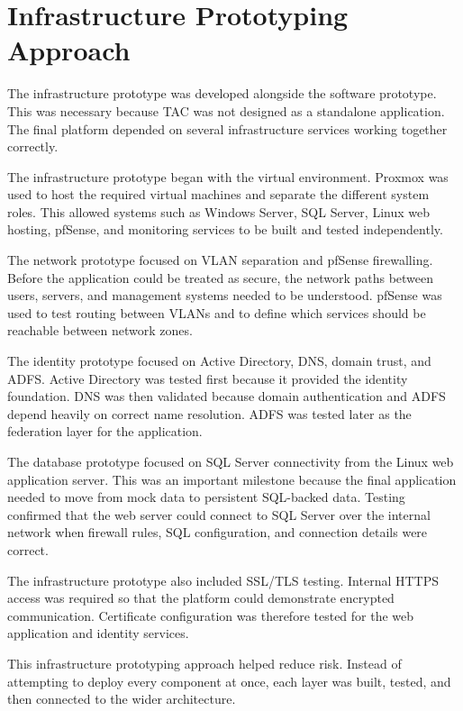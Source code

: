 \section{Infrastructure Prototyping Approach}

The infrastructure prototype was developed alongside the software prototype. This was necessary because TAC was not designed as a standalone application. The final platform depended on several infrastructure services working together correctly.

The infrastructure prototype began with the virtual environment. Proxmox was used to host the required virtual machines and separate the different system roles. This allowed systems such as Windows Server, SQL Server, Linux web hosting, pfSense, and monitoring services to be built and tested independently.

The network prototype focused on VLAN separation and pfSense firewalling. Before the application could be treated as secure, the network paths between users, servers, and management systems needed to be understood. pfSense was used to test routing between VLANs and to define which services should be reachable between network zones.

The identity prototype focused on Active Directory, DNS, domain trust, and ADFS. Active Directory was tested first because it provided the identity foundation. DNS was then validated because domain authentication and ADFS depend heavily on correct name resolution. ADFS was tested later as the federation layer for the application.

The database prototype focused on SQL Server connectivity from the Linux web application server. This was an important milestone because the final application needed to move from mock data to persistent SQL-backed data. Testing confirmed that the web server could connect to SQL Server over the internal network when firewall rules, SQL configuration, and connection details were correct.

The infrastructure prototype also included SSL/TLS testing. Internal HTTPS access was required so that the platform could demonstrate encrypted communication. Certificate configuration was therefore tested for the web application and identity services.

This infrastructure prototyping approach helped reduce risk. Instead of attempting to deploy every component at once, each layer was built, tested, and then connected to the wider architecture.


